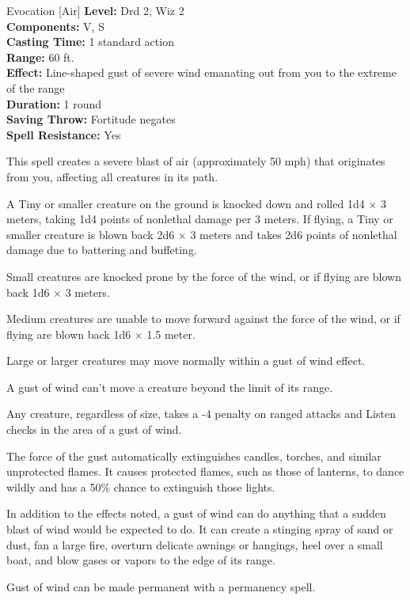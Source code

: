 {Evocation [Air]}
{
	\textbf{Level:}
	Drd 2, Wiz 2\\
	\textbf{Components:}
	V, S\\
	\textbf{Casting Time:}
	1 standard action\\
	\textbf{Range:}
	60 ft.\\
	\textbf{Effect:}
	Line-shaped gust of severe wind emanating out from you to the extreme of the range\\
	\textbf{Duration:}
	1 round\\
	\textbf{Saving Throw:}
	Fortitude negates\\
	\textbf{Spell Resistance:}
	Yes\\
}
{
	This spell creates a severe blast of air (approximately 50 mph) that originates from you, affecting all creatures in its path.

	A Tiny or smaller creature on the ground is knocked down and rolled 1d4 $\times$ 3 meters, taking 1d4 points of nonlethal damage per 3 meters. If flying, a Tiny or smaller creature is blown back 2d6 $\times$ 3 meters and takes 2d6 points of nonlethal damage due to battering and buffeting.

	Small creatures are knocked prone by the force of the wind, or if flying are blown back 1d6 $\times$ 3 meters.

	Medium creatures are unable to move forward against the force of the wind, or if flying are blown back 1d6 $\times$ 1.5 meter.

	Large or larger creatures may move normally within a gust of wind effect.

	A gust of wind can't move a creature beyond the limit of its range.

	Any creature, regardless of size, takes a -4 penalty on ranged attacks and Listen checks in the area of a gust of wind.

	The force of the gust automatically extinguishes candles, torches, and similar unprotected flames. It causes protected flames, such as those of lanterns, to dance wildly and has a 50\% chance to extinguish those lights.

	In addition to the effects noted, a gust of wind can do anything that a sudden blast of wind would be expected to do. It can create a stinging spray of sand or dust, fan a large fire, overturn delicate awnings or hangings, heel over a small boat, and blow gases or vapors to the edge of its range.

	Gust of wind can be made permanent with a permanency spell.

}
